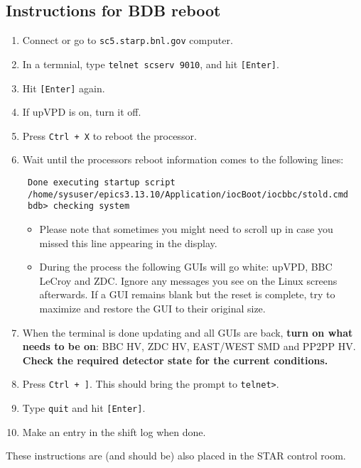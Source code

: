 \subsection{Instructions for BDB reboot}
\label{bdbreboot}

\begin{enumerate}
\item Connect or go to \texttt{sc5.starp.bnl.gov} computer.
\item In a termnial, type \texttt{telnet scserv 9010}, and hit \texttt{[Enter]}.
\item Hit  \texttt{[Enter]} again.
\item If upVPD is on, turn it off.
\item Press \texttt{Ctrl + X} to reboot the processor.
\item Wait until the processors reboot information comes to the following lines:
\noindent
\begin{verbatim}
 Done executing startup script
 /home/sysuser/epics3.13.10/Application/iocBoot/iocbbc/stold.cmd
 bdb> checking system
\end{verbatim}

\begin{itemize}
 \item Please note that sometimes you might need to scroll up in case you missed this line appearing in the display.
 \item During the process the following GUIs will go white: upVPD, BBC LeCroy and ZDC. Ignore any messages you see on the Linux screens afterwards. If a GUI remains blank but the reset is complete, try to maximize and restore the GUI to their original size.
\end{itemize}

\item When the terminal is done updating and all GUIs are back, \textbf{turn on what needs to be on}: BBC HV, ZDC HV, EAST/WEST SMD and PP2PP HV. \textbf{Check the required detector state for the current conditions.}
\item Press \texttt{Ctrl + ]}. This should bring the prompt to \texttt{telnet>}.
\item Type \texttt{quit} and hit \texttt{[Enter]}.
\item Make an entry in the shift log when done.
\end{enumerate}

These instructions are (and should be) also placed in the STAR control room.

 

